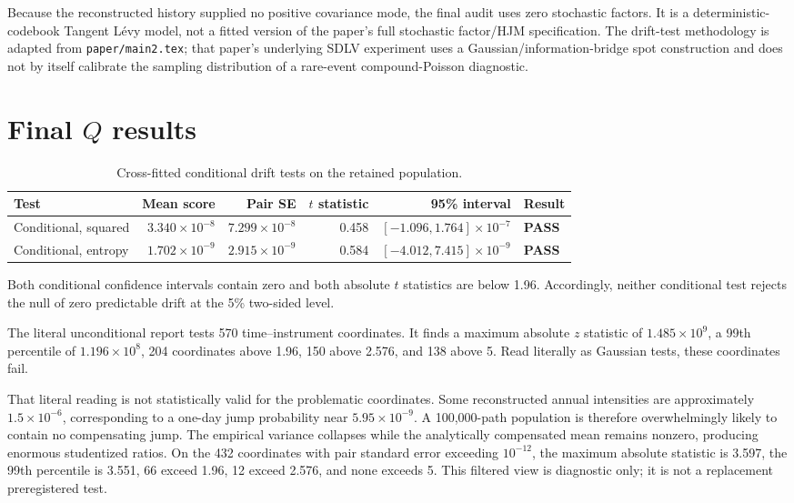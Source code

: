 \documentclass[11pt]{article}
\newcommand{\pass}{\textcolor{passgreen}{\textbf{PASS}}}
\begin{document}
Because the reconstructed history supplied no positive covariance mode, the
final audit uses zero stochastic factors.  It is a deterministic-codebook
Tangent L\'evy model, not a fitted version of the paper's full stochastic
factor/HJM specification.  The drift-test methodology is adapted from
\texttt{paper/main2.tex}; that paper's underlying SDLV experiment uses a
Gaussian/information-bridge spot construction and does not by itself calibrate
the sampling distribution of a rare-event compound-Poisson diagnostic.

\section{Final $Q$ results}

\begin{table}[h]
\centering
\begin{tabular}{lrrrrl}
\toprule
Test & Mean score & Pair SE & $t$ statistic & 95\% interval & Result \\
\midrule
Conditional, squared
  & $3.340\times10^{-8}$ & $7.299\times10^{-8}$ & 0.458
  & $[-1.096,1.764]\times10^{-7}$ & \pass \\
Conditional, entropy
  & $1.702\times10^{-9}$ & $2.915\times10^{-9}$ & 0.584
  & $[-4.012,7.415]\times10^{-9}$ & \pass \\
\bottomrule
\end{tabular}
\caption{Cross-fitted conditional drift tests on the retained population.}
\end{table}

Both conditional confidence intervals contain zero and both absolute
$t$ statistics are below 1.96.  Accordingly, neither conditional test rejects
the null of zero predictable drift at the 5\% two-sided level.

The literal unconditional report tests 570 time--instrument coordinates.  It
finds a maximum absolute $z$ statistic of $1.485\times10^9$, a 99th percentile
of $1.196\times10^8$, 204 coordinates above 1.96, 150 above 2.576, and 138
above 5.  Read literally as Gaussian tests, these coordinates fail.

That literal reading is not statistically valid for the problematic
coordinates.  Some reconstructed annual intensities are approximately
$1.5\times10^{-6}$, corresponding to a one-day jump probability near
$5.95\times10^{-9}$.  A 100,000-path population is therefore overwhelmingly
likely to contain no compensating jump.  The empirical variance collapses while
the analytically compensated mean remains nonzero, producing enormous
studentized ratios.  On the 432 coordinates with pair standard error exceeding
$10^{-12}$, the maximum absolute statistic is 3.597, the 99th percentile is
3.551, 66 exceed 1.96, 12 exceed 2.576, and none exceeds 5.  This filtered view
is diagnostic only; it is not a replacement preregistered test.
\end{document}
